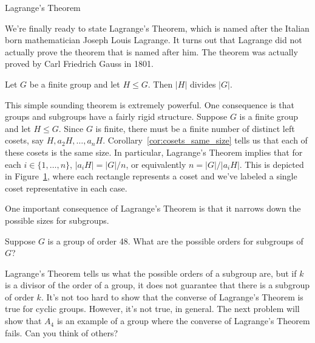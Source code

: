 \begin{section}{Lagrange's Theorem}

We're finally ready to state Lagrange's Theorem, which is named after the Italian born mathematician Joseph Louis Lagrange.  It turns out that Lagrange did not actually prove the theorem that is named after him.  The theorem was actually proved by Carl Friedrich Gauss in 1801.

\begin{theorem}
Let $G$ be a finite group and let $H\leq G$.  Then $|H|$ divides $|G|$.
\end{theorem}

This simple sounding theorem is extremely powerful.  One consequence is that groups and subgroups have a fairly rigid structure.  Suppose $G$ is a finite group and let $H\leq G$.  Since $G$ is finite, there must be a finite number of distinct left cosets, say $H, a_2H, \ldots, a_{n}H$.  Corollary~\ref{cor:cosets_same_size} tells us that each of these cosets is the same size.  In particular, Lagrange's Theorem implies that for each $i\in\{1,\ldots, n\}$, $|a_iH|=|G|/n$, or equivalently $n=|G|/|a_iH|$.  This is depicted in Figure~\ref{fig:Lagrange}, where each rectangle represents a coset and we've labeled a single coset representative in each case.

\begin{figure}[!ht]
\centering
{}
\caption{}
\label{fig:Lagrange}
\end{figure}

One important consequence of Lagrange's Theorem is that it narrows down the possible sizes for subgroups.

\begin{problem}
Suppose $G$ is a group of order 48.  What are the possible orders for subgroups of $G$?  
\end{problem}

Lagrange's Theorem tells us what the possible orders of a subgroup are, but if $k$ is a divisor of the order of a group, it does not guarantee that there is a subgroup of order $k$. It's not too hard to show that the converse of Lagrange's Theorem is true for cyclic groups.  However, it's not true, in general.  The next problem will show that $A_4$ is an example of a group where the converse of Lagrange's Theorem fails.  Can you think of others?


\end{section}

